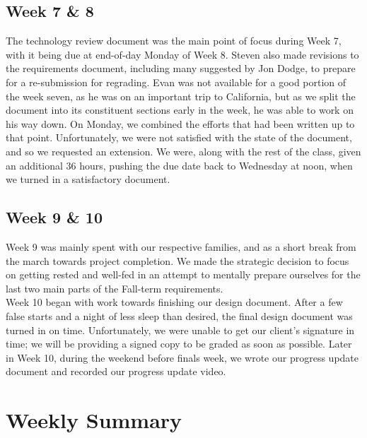 \documentclass[onecolumn, draftclsnofoot,10pt, compsoc]{IEEEtran}
\begin{document}
\subsection{Week 7 \& 8}
The technology review document was the main point of focus during Week 7, with 
it being due at end-of-day Monday of Week 8. Steven also made revisions to the 
requirements document, including many suggested by Jon Dodge, to prepare for a 
re-submission for regrading. Evan was not available for a good portion of the 
week seven, as he was on an important trip to California, but as we split the 
document into its constituent sections early in the week, he was able to work 
on his way down. On Monday, we combined the efforts that had been written up 
to that point. Unfortunately, we were not satisfied with the state of the 
document, and so we requested an extension. We were, along with the rest of 
the class, given an additional 36 hours, pushing the due date back to Wednesday 
at noon, when we turned in a satisfactory document.


\subsection{Week 9 \& 10}
Week 9 was mainly spent with our respective families, and as a short break from 
the march towards project completion. We made the strategic decision to focus 
on getting rested and well-fed in an attempt to mentally prepare ourselves for 
the last two main parts of the Fall-term requirements. \\
 
\noindent Week 10 began with work towards finishing our design document. After a few false 
starts and a night of less sleep than desired, the final design document was turned 
in on time. Unfortunately, we were unable to get our client's signature in time; 
we will be providing a signed copy to be graded as soon as possible. Later in Week 10, 
during the weekend before finals week, we wrote our progress update document and 
recorded our progress update video.


\section{Weekly Summary}
\end{document}
